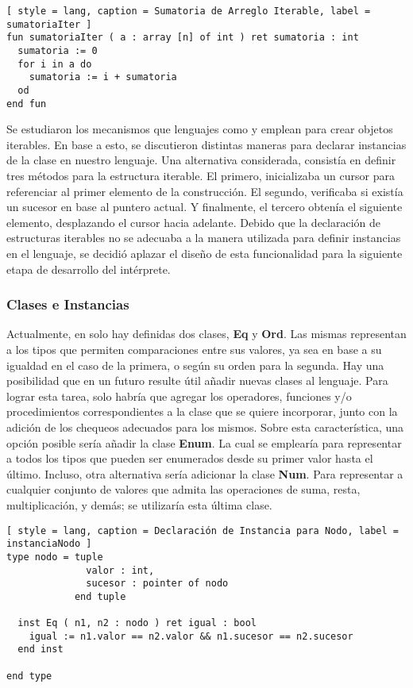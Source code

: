 \begin{lstlisting}[ style = lang, caption = Sumatoria de Arreglo Iterable, label = sumatoriaIter ]
fun sumatoriaIter ( a : array [n] of int ) ret sumatoria : int
  sumatoria := 0
  for i in a do
    sumatoria := i + sumatoria
  od
end fun
\end{lstlisting}

Se estudiaron los mecanismos que lenguajes como \Python{} y \Java{} emplean para crear objetos iterables.
En base a esto, se discutieron distintas maneras para declarar instancias de la clase en nuestro lenguaje.
Una alternativa considerada, consistía en definir tres métodos para la estructura iterable.
El primero, inicializaba un cursor para referenciar al primer elemento de la construcción.
El segundo, verificaba si existía un sucesor en base al puntero actual.
Y finalmente, el tercero obtenía el siguiente elemento, desplazando el cursor hacia adelante.
Debido que la declaración de estructuras iterables no se adecuaba a la manera utilizada para definir instancias en el lenguaje, se decidió aplazar el diseño de esta funcionalidad para la siguiente etapa de desarrollo del intérprete.

\subsubsection{Clases e Instancias}

Actualmente, en \Lenguaje{} solo hay definidas dos clases, \textbf{Eq} y \textbf{Ord}.
Las mismas representan a los tipos que permiten comparaciones entre sus valores, ya sea en base a su igualdad en el caso de la primera, o según su orden para la segunda.
Hay una posibilidad que en un futuro resulte útil añadir nuevas clases al lenguaje.
Para lograr esta tarea, solo habría que agregar los operadores, funciones y/o procedimientos correspondientes a la clase que se quiere incorporar, junto con la adición de los chequeos adecuados para los mismos.
Sobre esta característica, una opción posible sería añadir la clase \textbf{Enum}.
La cual se emplearía para representar a todos los tipos que pueden ser enumerados desde su primer valor hasta el último.
Incluso, otra alternativa sería adicionar la clase \textbf{Num}.
Para representar a cualquier conjunto de valores que admita las operaciones de suma, resta, multiplicación, y demás; se utilizaría esta última clase.

\begin{lstlisting}[ style = lang, caption = Declaración de Instancia para Nodo, label = instanciaNodo ]
type nodo = tuple
              valor : int,
              sucesor : pointer of nodo
            end tuple

  inst Eq ( n1, n2 : nodo ) ret igual : bool
    igual := n1.valor == n2.valor && n1.sucesor == n2.sucesor
  end inst

end type
\end{lstlisting}

